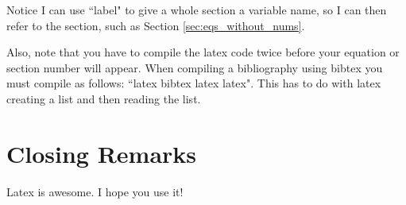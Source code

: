 \documentclass[11pt]{article}
\begin{document}
Notice I can use ``label" to give a whole section a variable name, so I can then refer to the section, such as Section \eqref{sec:eqs_without_nums}.

Also, note that you have to compile the latex code twice before your equation or section number will appear. When compiling a bibliography using bibtex you must compile as follows: ``latex bibtex latex latex". This has to do with latex creating a list and then reading the list. 

\section{Closing Remarks}

Latex is awesome. I hope you use it!
\end{document}
